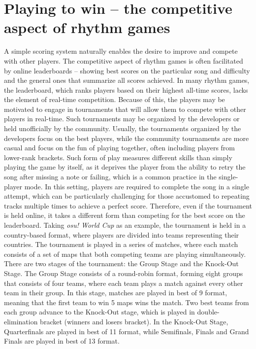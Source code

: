 \section{Playing to win -- the competitive aspect of rhythm games}
A simple scoring system naturally enables the desire to improve and compete with other players. The competitive aspect of rhythm games is often facilitated by online leaderboards -- showing best scores on the particular song and difficulty and the general ones that summarize all scores achieved. In many rhythm games, the leaderboard, which ranks players based on their highest all-time scores, lacks the element of real-time competition. Because of this, the players may be motivated to engage in tournaments that will allow them to compete with other players in real-time. Such tournaments may be organized by the developers or held unofficially by the community. Usually, the tournaments organized by the developers focus on the best players, while the community tournaments are more casual and focus on the fun of playing together, often including players from lower-rank brackets. Such form of play measures different skills than simply playing the game by itself, as it deprives the player from the ability to retry the song after missing a note or failing, which is a common practice in the single-player mode. In this setting, players are required to complete the song in a single attempt, which can be particularly challenging for those accustomed to repeating tracks multiple times to achieve a perfect score. Therefore, even if the tournament is held online, it takes a different form than competing for the best score on the leaderboard.
Taking \textit{osu! World Cup} as an example, the tournament is held in a country-based format, where players are divided into teams representing their countries. The tournament is played in a series of matches, where each match consists of a set of maps that both competing teams are playing simultaneously. There are two stages of the tournament: the Group Stage and the Knock-Out Stage. The Group Stage consists of a round-robin format, forming eight groups that consists of four teams, where each team plays a match against every other team in their group. In this stage, matches are played in best of 9 format, meaning that the first team to win 5 maps wins the match. Two best teams from each group advance to the Knock-Out stage, which is played in double-elimination bracket (winners and losers bracket). In the Knock-Out Stage, Quarterfinals are played in best of 11 format, while Semifinals, Finals and Grand Finals are played in best of 13 format.

